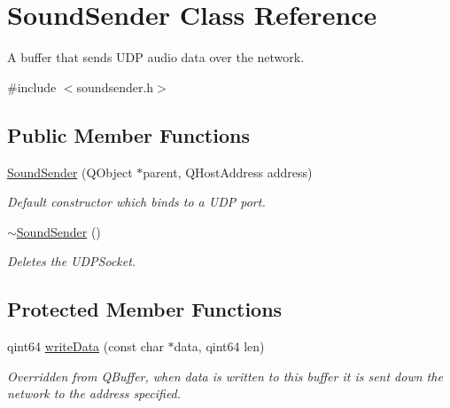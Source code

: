 \hypertarget{class_sound_sender}{
\section{\-Sound\-Sender \-Class \-Reference}
\label{class_sound_sender}
}


\-A buffer that sends \-U\-D\-P audio data over the network.  




{\ttfamily \#include $<$soundsender.\-h$>$}

\subsection*{\-Public \-Member \-Functions}
\begin{DoxyCompactItemize}
\item 
\hyperlink{class_sound_sender_a15a16cf2d16d1de5de0f0d0e4b4ce5c9}{\-Sound\-Sender} (\-Q\-Object $\ast$parent, \-Q\-Host\-Address address)
\begin{DoxyCompactList}\small\item\em \-Default constructor which binds to a \-U\-D\-P port. \end{DoxyCompactList}\item 
\hypertarget{class_sound_sender_a15f4c11ed7d489972876697b776b27ab}{
\hyperlink{class_sound_sender_a15f4c11ed7d489972876697b776b27ab}{$\sim$\-Sound\-Sender} ()}
\label{class_sound_sender_a15f4c11ed7d489972876697b776b27ab}

\begin{DoxyCompactList}\small\item\em \-Deletes the \-U\-D\-P\-Socket. \end{DoxyCompactList}\end{DoxyCompactItemize}
\subsection*{\-Protected \-Member \-Functions}
\begin{DoxyCompactItemize}
\item 
qint64 \hyperlink{class_sound_sender_a2557d162440651dcee73996162d4820a}{write\-Data} (const char $\ast$data, qint64 len)
\begin{DoxyCompactList}\small\item\em \-Overridden from \-Q\-Buffer, when data is written to this buffer it is sent down the network to the address specified. \end{DoxyCompactList}\end{DoxyCompactItemize}


